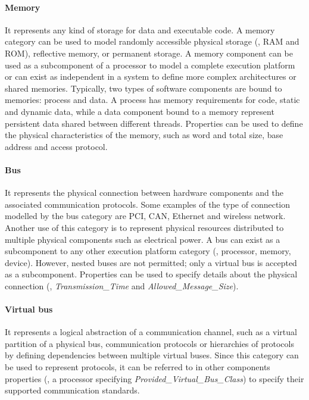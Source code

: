 \paragraph{Memory}  It represents any kind of storage for data and executable code. A memory category can be used to model randomly accessible physical storage (\eg, RAM and ROM), reflective memory, or permanent storage. A memory component can be used as a subcomponent of a processor to model a complete execution platform or can exist as independent in a system to define more complex architectures or shared memories. Typically, two types of software components are bound to memories: process and data. A process has memory requirements for code, static and dynamic data, while a data component bound to a memory represent persistent data shared between different threads. Properties can be used to define the physical characteristics of the memory, such as word and total size, base address and access protocol.

\paragraph{Bus} It represents the physical connection between hardware components and the associated communication protocols. Some examples of the type of connection modelled by the bus category are PCI, CAN, Ethernet and wireless network. Another use of this category is to represent physical resources distributed to multiple physical components such as electrical power. A bus can exist as a subcomponent to any other execution platform category (\ie, processor, memory, device). However, nested buses are not permitted; only a virtual bus is accepted as a subcomponent. Properties can be used to specify details about the physical connection (\eg, \textit{Transmission\_Time} and \textit{Allowed\_Message\_Size}).

\paragraph{Virtual bus} It represents a logical abstraction of a communication channel, such as a virtual partition of a physical bus, communication protocols or hierarchies of protocols by defining dependencies between multiple virtual buses. Since this category can be used to represent protocols, it can be referred to in other components properties (\eg, a processor specifying \textit{Provided\_Virtual\_Bus\_Class}) to specify their supported communication standards.

